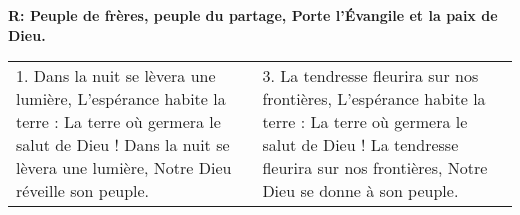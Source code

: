 
\textbf{R:
Peuple de frères, peuple du partage,
Porte l'Évangile et la paix de Dieu.}

\begin{tabular}{p{} p{}}
1.
Dans la nuit se lèvera une lumière,\newline
L'espérance habite la terre :\newline
La terre où germera le salut de Dieu !\newline
Dans la nuit se lèvera une lumière,\newline
Notre Dieu réveille son peuple.
&
3.
La tendresse fleurira sur nos frontières,\newline
L'espérance habite la terre :\newline
La terre où germera le salut de Dieu !\newline
La tendresse fleurira sur nos frontières,\newline
Notre Dieu se donne à son peuple.
\end{tabular}

